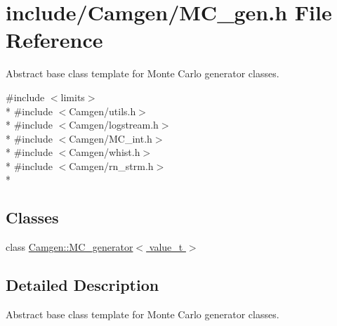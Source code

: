 \hypertarget{a00671}{\section{include/\-Camgen/\-M\-C\-\_\-gen.h File Reference}
\label{a00671}
}


Abstract base class template for Monte Carlo generator classes.  


{\ttfamily \#include $<$limits$>$}\\*
{\ttfamily \#include $<$Camgen/utils.\-h$>$}\\*
{\ttfamily \#include $<$Camgen/logstream.\-h$>$}\\*
{\ttfamily \#include $<$Camgen/\-M\-C\-\_\-int.\-h$>$}\\*
{\ttfamily \#include $<$Camgen/whist.\-h$>$}\\*
{\ttfamily \#include $<$Camgen/rn\-\_\-strm.\-h$>$}\\*
\subsection*{Classes}
\begin{DoxyCompactItemize}
\item 
class \hyperlink{a00362}{Camgen\-::\-M\-C\-\_\-generator$<$ value\-\_\-t $>$}
\end{DoxyCompactItemize}


\subsection{Detailed Description}
Abstract base class template for Monte Carlo generator classes. 
